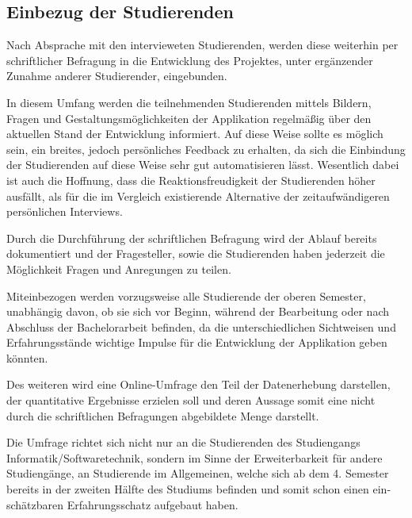 \documentclass{scrreprt}
\begin{document}
\subsection{Einbezug der Studierenden}
\par Nach Absprache mit den intervieweten Studierenden, werden diese weiterhin per schriftlicher Befragung in die Entwicklung des Projektes, unter ergänzender Zunahme anderer Studierender, eingebunden.
\par In diesem Umfang werden die teilnehmenden Studierenden mittels Bildern, Fragen und Gestaltungsmöglichkeiten der Applikation regelmäßig über den aktuellen Stand der Entwicklung informiert. Auf diese Weise sollte es möglich sein, ein breites, jedoch persönliches Feedback zu erhalten, da sich die Einbindung der Studierenden auf diese Weise sehr gut automatisieren lässt. Wesentlich dabei ist auch die Hoffnung, dass die Reaktionsfreudigkeit der Studierenden höher ausfällt, als für die im Vergleich existierende Alternative der zeitaufwändigeren persönlichen Interviews.
\par Durch die Durchführung der schriftlichen Befragung wird der Ablauf bereits dokumentiert und der Fragesteller, sowie die Studierenden haben jederzeit die Möglichkeit Fragen und Anregungen zu teilen.
\par Miteinbezogen werden vorzugsweise alle Studierende der oberen Semester, unabhängig davon, ob sie sich vor Beginn, während der Bearbeitung oder nach Abschluss der Bachelorarbeit befinden, da die unterschiedlichen Sichtweisen und Erfahrungsstände wichtige Impulse für die Entwicklung der Applikation geben könnten.
\par\medskip Des weiteren wird eine Online-Umfrage den Teil der Datenerhebung darstellen, der quantitative Ergebnisse erzielen soll und deren Aussage somit eine nicht durch die schriftlichen Befragungen abgebildete Menge darstellt.
\par Die Umfrage richtet sich nicht nur an die Studierenden des Studiengangs Informatik/Softwaretechnik, sondern im Sinne der Erweiterbarkeit für andere Studiengänge, an Studierende im Allgemeinen, welche sich ab dem 4. Semester bereits in der zweiten Hälfte des Studiums befinden und somit schon einen ein­schätz­baren Erfahrungsschatz aufgebaut haben.
\end{document}
